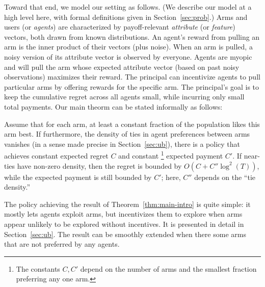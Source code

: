 
Toward that end, we model our setting as follows.
(We describe our model at a high level here,
with formal definitions given in Section~\ref{sec:prob}.)
Arms and users (or \emph{agents}) are characterized by payoff-relevant
\emph{attribute} (or \emph{feature}) vectors,
both drawn from known distributions.
An agent's reward from pulling an arm is the inner product of their
vectors (plus noise).
When an arm is pulled, a noisy version of its attribute vector is
observed by everyone.
Agents are myopic and will pull the arm whose expected attribute
vector (based on past noisy observations) maximizes their reward.
The principal can incentivize agents to pull particular arms by
offering rewards for the specific arm.
The principal's goal is to keep the cumulative regret across all
agents small, while incurring only small total payments.
Our main theorm can be stated informally as follows:

\begin{theorem} \label{thm:main-intro}
Assume that for each arm, at least a constant fraction of the
population likes this arm best.
If furthermore, the density of ties in agent preferences between arms
vanishes (in a sense made precise in Section~\ref{sec:ub}),
there is a policy that achieves constant
expected regret $C$ and constant%
\footnote{The constants $C,C'$ depend on the number of arms and the
  smallest fraction preferring any one arm.} expected payment $C'$.
If near-ties have non-zero density,
then the regret is bounded by $O(C + C'' \log^2(T))$,
while the expected payment is still bounded by $C'$;
here, $C''$ depends on the ``tie density.''
\end{theorem}

The policy achieving the result of Theorem~\ref{thm:main-intro} is
quite simple: it mostly lets agents exploit arms, but incentivizes
them to explore when arms appear unlikely to be explored without incentives.
It is presented in detail in Section~\ref{sec:ub}.
The result can be smoothly extended when there some arms that are not
preferred by any agents.

